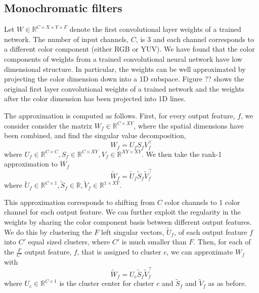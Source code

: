 
\subsection{Monochromatic filters}
Let $W \in \mathbb{R}^{C \times X \times Y \times F}$ denote the first convolutional layer weights of a trained network. The number of input channels, $C$, is 3 and each channel corresponds to a different color component (either RGB or YUV). We have found that the color components of weights from a trained convolutional neural network have low dimensional structure. In particular, the weights can be well approximated by projecting the color dimension down into a 1D subspace. Figure ?? shows the original first layer convolutional weights of a trained network and the weights after the color dimension has been projected into 1D lines. 

The approximation is computed as follows. First, for every output feature, $f$, we consider consider the matrix $W_f \in \mathbb{R}^{C \times XY }$, where the spatial dimensions have been combined, and find the singular value decomposition, 
\begin{equation*}
	W_f = U_f S_f V_f^{\top}
\end{equation*}
where $U_f \in \mathbb{R}^{C \times C}, S_f \in \mathbb{R}^{C \times XY}, V_f \in \mathbb{R}^{XY \times XY}$. We then take the rank-1 approximation to $W_f$ 
\begin{equation*}
	\tilde{W}_f = \tilde{U}_f \tilde{S}_f \tilde{V}_f^{\top}
\end{equation*}
where $\tilde{U}_f \in \mathbb{R}^{C \times 1}, \tilde{S}_f \in \mathbb{R}, \tilde{V}_f \in \mathbb{R}^{1 \times XY}$.

This approximation corresponds to shifting from $C$ color channels to 1 color channel for each output feature. We can further exploit the regularity in the weights by sharing the color component basis between different output features. We do this by clustering the $F$ left singular vectors,  $\tilde{U}_f$, of each output feature $f$ into $C'$ equal sized clusters, where $C'$ is much smaller than $F$. Then, for each of the $\frac{F}{C'}$ output feature, $f$, that is assigned to cluster $c$, we can approximate $W_f$ with
\begin{equation*}
	\tilde{W}_f = U_c \tilde{S}_f \tilde{V}_f^{\top}
\end{equation*}
where $U_c \in \mathbb{R}^{C \times 1}$ is the cluster center for cluster $c$ and $\tilde{S}_f$ and $\tilde{V}_f$ as as before. 

